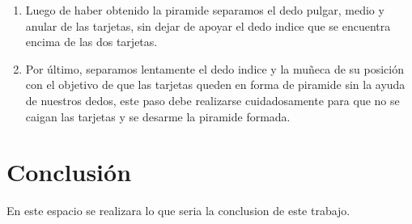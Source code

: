 \documentclass{article}
\begin{document}
\begin{enumerate}
\item Luego de haber obtenido la piramide separamos el dedo pulgar, medio y anular de las tarjetas, sin dejar de apoyar el dedo indice que se encuentra encima de las dos tarjetas.

\item Por último, separamos lentamente el dedo indice y la muñeca de su posición con el objetivo de que las tarjetas queden en forma de piramide sin la ayuda de nuestros dedos, este paso debe realizarse cuidadosamente para que no se caigan las tarjetas y se desarme la piramide formada.  
    
\end{enumerate}

\section{Conclusión} \label{conclulsion}
\noindent
En este espacio se realizara lo que seria la conclusion de este trabajo.
\end{document}

